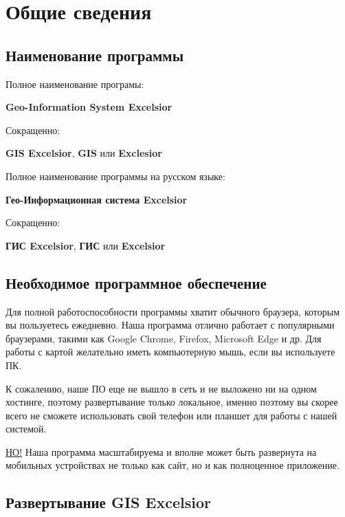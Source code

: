 
\section{Общие сведения}

\subsection{Наименование программы}

%
Полное наименование програмы: 
\begin{center}
	\textbf{Geo-Information System Excelsior}
\end{center}

Сокращенно: 
\begin{center}
	\textbf{GIS Excelsior}, \textbf{GIS} или \textbf{Exclesior}
\end{center}

Полное наименование программы на русском языке:
\begin{center}
	\textbf{Гео-Информационная система Excelsior}
\end{center}

Сокращенно: 
\begin{center}
	\textbf{ГИС Excelsior}, \textbf{ГИС} или \textbf{Excelsior}
\end{center}
%



\subsection{Необходимое программное обеспечение}

%
Для полной работоспособности программы хватит обычного браузера, которым вы пользуетесь ежедневно. Наша программа отлично работает с популярными браузерами, такими как Google Chrome, Firefox, Microsoft Edge и др. Для работы с картой желательно иметь компьютерную мышь, если вы используете ПК.

К сожалению, наше ПО еще не вышло в сеть и не выложено ни на одном хостинге, поэтому развертывание только локальное, именно поэтому вы скорее всего не сможете использовать свой телефон или планшет для работы с нашей системой. 

\underline{НО!} Наша программа масштабируема и вполне может быть развернута на мобильных устройствах не только как сайт, но и как полноценное приложение.
%



\subsection{Развертывание GIS Excelsior}


